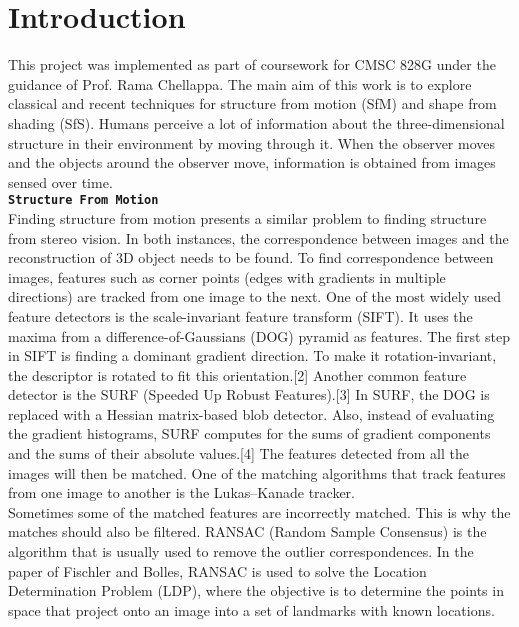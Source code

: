 \documentclass[preprint,12pt]{elsarticle}
\begin{document}

\section{Introduction}
\label{S:1}

This project was implemented as part of coursework for CMSC 828G under the guidance of Prof. Rama Chellappa. The main aim of this work is to explore classical and recent techniques for structure from motion (SfM) and shape from shading (SfS). Humans perceive a lot of information about the three-dimensional structure in their environment by moving through it. When the observer moves and the objects around the observer move, information is obtained from images sensed over time.\\

\large{\texttt{\textbf{Structure From Motion}}}\\
Finding structure from motion presents a similar problem to finding structure from stereo vision. In both instances, the correspondence between images and the reconstruction of 3D object needs to be found. To find correspondence between images, features such as corner points (edges with gradients in multiple directions) are tracked from one image to the next. One of the most widely used feature detectors is the scale-invariant feature transform (SIFT). It uses the maxima from a difference-of-Gaussians (DOG) pyramid as features. The first step in SIFT is finding a dominant gradient direction. To make it rotation-invariant, the descriptor is rotated to fit this orientation.[2] Another common feature detector is the SURF (Speeded Up Robust Features).[3] In SURF, the DOG is replaced with a Hessian matrix-based blob detector. Also, instead of evaluating the gradient histograms, SURF computes for the sums of gradient components and the sums of their absolute values.[4] The features detected from all the images will then be matched. One of the matching algorithms that track features from one image to another is the Lukas–Kanade tracker.\\

Sometimes some of the matched features are incorrectly matched. This is why the matches should also be filtered. RANSAC (Random Sample Consensus) is the algorithm that is usually used to remove the outlier correspondences. In the paper of Fischler and Bolles, RANSAC is used to solve the Location Determination Problem (LDP), where the objective is to determine the points in space that project onto an image into a set of landmarks with known locations.\\
\end{document}
